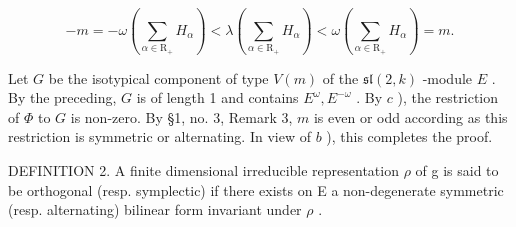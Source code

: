 \[
- m = - \omega \left(\sum_ {\alpha \in \mathrm{R} _ {+}} H _ {\alpha}\right) <   \lambda \left(\sum_ {\alpha \in \mathrm{R} _ {+}} H _ {\alpha}\right) <   \omega \left(\sum_ {\alpha \in \mathrm{R} _ {+}} H _ {\alpha}\right) = m.
\]

Let \(G\) be the isotypical component of type \(V(m)\) of the \(\mathfrak{sl}(2, k)\) -module \(E\) . By the preceding, \(G\) is of length 1 and contains \(E^{\omega}, E^{-\omega}\) . By \(c\) ), the restriction of \(\Phi\) to \(G\) is non-zero. By §1, no. 3, Remark 3, \(m\) is even or odd according as this restriction is symmetric or alternating. In view of \(b\) ), this completes the proof.

DEFINITION 2. A finite dimensional irreducible representation \(\rho\) of g is said to be orthogonal (resp. symplectic) if there exists on E a non-degenerate symmetric (resp. alternating) bilinear form invariant under \(\rho\) .

